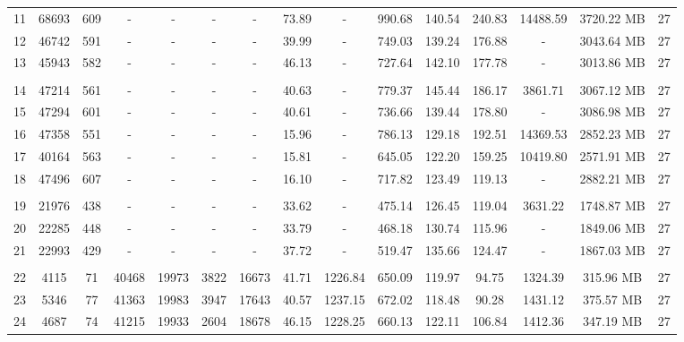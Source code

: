 \begin{table}
{\begin{tabular}{|c||c|c|c|c|c|c|c|c|c|c|c|c|c|c|}
            11 & 68693 & 609 & - & - & - & - & 73.89 & - & 990.68 & 140.54 & 240.83 & 14488.59 & 3720.22 MB & 27 \\
            12 & 46742 & 591 & - & - & - & - & 39.99 & - & 749.03 & 139.24 & 176.88 & - & 3043.64 MB & 27 \\
            13 & 45943 & 582 & - & - & - & - & 46.13 & - & 727.64 & 142.10 & 177.78 & - & 3013.86 MB & 27 \\
            \hline
            \multicolumn{13}{c}{\rule{0pt}{2.5pt}} \\ %
            \hline
            14 & 47214 & 561 & - & - & - & - & 40.63 & - & 779.37 & 145.44 & 186.17 & 3861.71 & 3067.12 MB & 27 \\
            15 & 47294 & 601 & - & - & - & - & 40.61 & - & 736.66 & 139.44 & 178.80 & - & 3086.98 MB & 27 \\
            16 & 47358 & 551 & - & - & - & - & 15.96 & - & 786.13 & 129.18 & 192.51 & 14369.53 & 2852.23 MB & 27 \\
            17 & 40164 & 563 & - & - & - & - & 15.81 & - & 645.05 & 122.20 & 159.25 & 10419.80 & 2571.91 MB & 27 \\
            18 & 47496 & 607 & - & - & - & - & 16.10 & - & 717.82 & 123.49 & 119.13 & - & 2882.21 MB & 27 \\
            \hline
            \multicolumn{13}{c}{\rule{0pt}{2.5pt}} \\ %
            \hline
            19 & 21976 & 438 & - & - & - & - & 33.62 & - & 475.14 & 126.45 & 119.04 & 3631.22 & 1748.87 MB & 27 \\
            20 & 22285 & 448 & - & - & - & - & 33.79 & - & 468.18 & 130.74 & 115.96 & - & 1849.06 MB & 27 \\
            21 & 22993 & 429 & - & - & - & - & 37.72 & - & 519.47 & 135.66 & 124.47 & - & 1867.03 MB & 27 \\
            \hline
            \multicolumn{13}{c}{\rule{0pt}{2.5pt}} \\ %
            \hline
            22 & 4115 & 71 & 40468 & 19973 & 3822 & 16673 & 41.71 & 1226.84 & 650.09 & 119.97 & 94.75 & 1324.39 & 315.96 MB & 27 \\
            23 & 5346 & 77 & 41363 & 19983 & 3947 & 17643 & 40.57 & 1237.15 & 672.02 & 118.48 & 90.28 & 1431.12 & 375.57 MB & 27 \\
            24 & 4687 & 74 & 41215 & 19933 & 2604 & 18678 & 46.15 & 1228.25 & 660.13 & 122.11 & 106.84 & 1412.36 & 347.19 MB & 27 \\

\end{tabular}}
\end{table}
